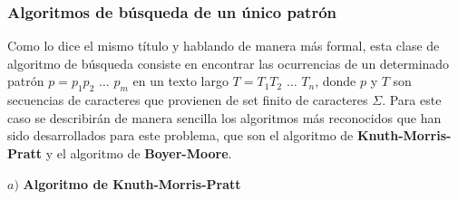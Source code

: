 \subsubsection{Algoritmos de búsqueda de un único patrón}
Como lo dice el mismo título y hablando de manera más formal, esta clase de algoritmo de búsqueda consiste en encontrar las ocurrencias de un determinado patrón \cite{stringmatching} $p=p_{1}p_{2}$ $\ldots$ $p_{m}$ en un texto largo $T=T_{1}T_{2}$ $\ldots$ $T_{n}$, donde $p$ y $T$ son secuencias de caracteres que provienen de set finito de caracteres $\Sigma$.
Para este caso se describirán de manera sencilla los algoritmos más reconocidos que han sido desarrollados para este problema, que son el algoritmo de \textbf{Knuth-Morris-Pratt} y el algoritmo de \textbf{Boyer-Moore}.

$a)$ \textbf{Algoritmo de Knuth-Morris-Pratt}

